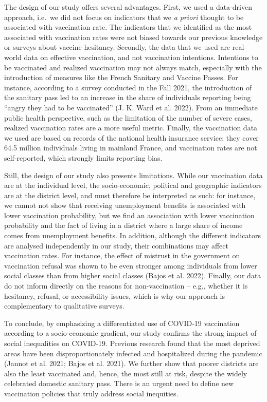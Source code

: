 \documentclass[
]{article}
\begin{document}
The design of our study offers several advantages. First, we used a
data-driven approach, i.e.~we did not focus on indicators that we
\emph{a priori} thought to be associated with vaccination rate. The
indicators that we identified as the most associated with vaccination
rates were not biased towards our previous knowledge or surveys about
vaccine hesitancy. Secondly, the data that we used are real-world data
on effective vaccination, and not vaccination intentions. Intentions to
be vaccinated and realized vaccination may not always match, especially
with the introduction of measures like the French Sanitary and Vaccine
Passes. For instance, according to a survey conducted in the Fall 2021,
the introduction of the sanitary pass led to an increase in the share of
individuals reporting being ``angry they had to be vaccinated'' (J. K.
Ward et al. 2022). From an immediate public health perspective, such as
the limitation of the number of severe cases, realized vaccination rates
are a more useful metric. Finally, the vaccination data we used are
based on records of the national health insurance service: they cover
64.5 million individuals living in mainland France, and vaccination
rates are not self-reported, which strongly limits reporting bias.

Still, the design of our study also presents limitations. While our
vaccination data are at the individual level, the socio-economic,
political and geographic indicators are at the district level, and must
therefore be interpreted as such: for instance, we cannot not show that
receiving unemployment benefits is associated with lower vaccination
probability, but we find an association with lower vaccination
probability and the fact of living in a district where a large share of
income comes from unemployment benefits. In addition, although the
different indicators are analysed independently in our study, their
combinations may affect vaccination rates. For instance, the effect of
mistrust in the government on vaccination refusal was shown to be even
stronger among individuals from lower social classes than from higher
social classes (Bajos et al. 2022). Finally, our data do not inform
directly on the reasons for non-vaccination -- e.g., whether it is
hesitancy, refusal, or accessibility issues, which is why our approach
is complementary to qualitative surveys.

To conclude, by emphasizing a differentiated use of COVID-19 vaccination
according to a socio-economic gradient, our study confirms the strong
impact of social inequalities on COVID-19. Previous research found that
the most deprived areas have been disproportionately infected and
hospitalized during the pandemic (Jannot et al. 2021; Bajos et al.
2021). We further show that poorer districts are also the least
vaccinated and, hence, the most still at risk, despite the widely
celebrated domestic sanitary pass. There is an urgent need to define new
vaccination policies that truly address social inequities.
\end{document}
